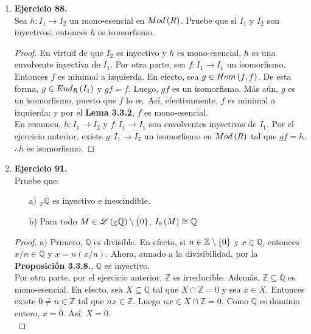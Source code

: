 \documentclass{article}
\begin{document}
\begin{enumerate}
	\item \textbf{Ejercicio 88.}\\
	Sea $h:I_{1} \longrightarrow I_{2}$ un mono-esencial en $Mod\left(R\right)$. Pruebe que si $I_{1}$ y $I_{2}$ son inyectivos, entonces $h$ es isomorfismo.
	\begin{proof}
		En virtud de que $I_{2}$ es inyectivo y $h$ es mono-esencial, $h$ es una envolvente inyectiva de $I_{1}$. Por otra parte, sea $f:I_{1} \longrightarrow I_{1}$ un isomorfismo. Entonces $f$ es minimal a izquierda. En efecto, sea $g \in Hom\left(f,f\right)$. De esta forma, $g \in End_{R}\left(I_{1}\right)$ y $gf=f$. Luego, $gf$ es un isomorfismo. Más aún, $g$ es un isomorfismo, puesto que $f$ lo es. Así, efectivamente, $f$ es minimal a izquierda; y por el \textbf{Lema 3.3.2}, $f$ es mono-esencial.\\
		
		En resumen, $h:I_{1} \longrightarrow I_{2}$ y $f:I_{1} \longrightarrow I_{1}$ son envolventes inyectivas de $I_{1}$. Por el ejercicio anterior, existe $g:I_{1} \longrightarrow I_{2}$ un isomorfismo en $Mod\left(R\right)$ tal que $gf=h$. $\therefore h$ es isomorfismo.
	\end{proof}
	
	\item \textbf{Ejercicio 91.}\\
	Pruebe que:
	\begin{itemize}
		\item[a)] ${}_{\mathbb{Z}}\mathbb{Q}$ es inyectivo e inescindible.
		\item[b)] Para todo $M\in\mathscr{L}\left({}_{\mathbb{Z}}\mathbb{Q}\right)\setminus\left\{0\right\}$, $I_{0}\left(M\right)\cong\mathbb{Q}$
	\end{itemize}
	\begin{proof}
		$\boxed{\text{a)}}$ Primero, $\mathbb{Q}$ es divisible. En efecto, si $n\in\mathbb{Z}\setminus\left\{0\right\}$ y $x\in\mathbb{Q}$, entonces $x/n\in\mathbb{Q}$ y $x=n(x/n)$. Ahora, aunado a la divisibilidad, por la \textbf{Proposición 3.3.8.}, $\mathbb{Q}$ es inyectivo.\\
		
		Por otra parte, por el ejercicio anterior, $\mathbb{Z}$ es irreducible. Además, $\mathbb{Z}\subseteq\mathbb{Q}$ es mono-esencial. En efecto, sea $X\subseteq\mathbb{Q}$ tal que $X\cap\mathbb{Z}=0$ y sea $x \in X$. Entonces existe $0 \neq n\in\mathbb{Z}$ tal que $nx\in\mathbb{Z}$. Luego $nx \in X\cap\mathbb{Z}=0$. Como $\mathbb{Q}$ es dominio entero, $x=0$. Así, $X=0$.\\
		

\end{proof}
\end{enumerate}
\end{document}
